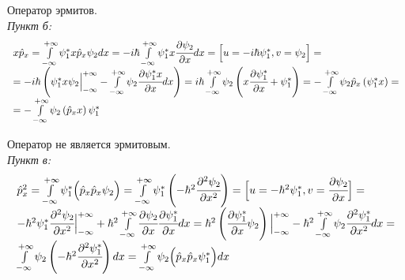 Оператор эрмитов. \\

\emph{Пункт б:}
\[
\begin{array}{ll}
	x\hat{p}_{x} = \int\limits_{-\infty}^{+\infty} \psi_{1}^{*} x\hat{p}_{x}
		\psi_{2} dx = -i\hbar \int\limits_{-\infty}^{+\infty} \psi_{1}^{*}
		x\cfrac{\partial\psi_2}{\partial x} dx =
		\Big[ u = -i\hbar\psi_{1}^{*}, v = \psi_{2} \Big] = \\ =
		-i\hbar\left( \psi_{1}^{*} x \psi_{2} 
		\Big\vert_{-\infty}^{+\infty} - 
		\int\limits_{-\infty}^{+\infty} \psi_{2} 
		\cfrac{\partial \psi_{1}^{*} x}{\partial x} dx \right) =
		i\hbar\int\limits_{-\infty}^{+\infty} \psi_{2} 
		\left( x\cfrac{\partial\psi_{1}^{*}}{\partial x} + \psi_{1}^{*} \right) =
		-\int\limits_{-\infty}^{+\infty} \psi_{2} 
		\hat{p}_x \left( \psi_{1}^{*} x \right) = \\ =
		-\int\limits_{-\infty}^{+\infty} \psi_{2} 
		\left( \hat{p}_x x \right) \psi_{1}^{*}
\end{array}
\]

Оператор не является эрмитовым. \\

\emph{Пункт в:}
\[
\begin{array}{ll}
	\hat{p}^2_x = \int\limits_{-\infty}^{+\infty} \psi_{1}^{*} \Big( \hat{p}_{x} 
		\hat{p}_{x} \psi_{2} \Big) = 
		\int\limits_{-\infty}^{+\infty} \psi_{1}^{*} \left( 
		-\hbar^{2} \cfrac{\partial^{2} \psi_{2}}{\partial x^2} \right) =
		\Big[ u = -\hbar^2 \psi_{1}^{*}, 
		v = \cfrac{\partial \psi_{2}}{\partial x} \Big] = \\
		-\hbar^{2} \psi_{1}^{*} \cfrac{\partial^{2} \psi_{2}}{\partial x^2} 
		\Big\vert_{-\infty}^{+\infty} + \hbar^{2} \int\limits_{-\infty}^{+\infty}
		\cfrac{\partial\psi_{2}}{\partial x}
		\cfrac{\partial\psi_{1}^{*}}{\partial x} dx =
		\hbar^{2}\left( 
		\cfrac{\partial\psi_{1}^{*}}{\partial x} \psi_{2}\right)
		\Big\vert_{-\infty}^{+\infty} -\hbar^{2} \int\limits_{-\infty}^{+\infty} 
		\psi_{2} \cfrac{\partial^{2}\psi_{1}^{*}}{\partial x^2} dx = \\
		\int\limits_{-\infty}^{+\infty} \psi_{2} 
		\left( -\hbar^{2} \cfrac{\partial^{2}\psi_{1}^{*}}{\partial x^2} \right)dx =
		\int\limits_{-\infty}^{+\infty} \psi_{2} 
		\Big( \hat{p}_{x} \hat{p}_{x} \psi_{1}^{*} \Big) dx 
\end{array}
\]

